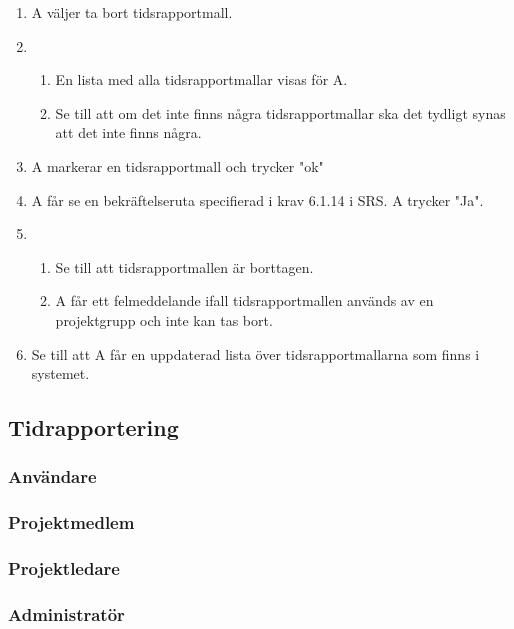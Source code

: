\documentclass[a4paper]{article}
\begin{document}
\begin{ST}
\begin{enumerate}
\item A väljer ta bort tidsrapportmall.
\item 
\begin{enumerate}
\item En lista med alla tidsrapportmallar visas för A.
\item Se till att om det inte finns några tidsrapportmallar ska det tydligt synas att det inte finns några.
\end{enumerate}
\item A markerar en tidsrapportmall och trycker "ok"
\item A får se en bekräftelseruta specifierad i krav 6.1.14 i SRS. A trycker "Ja".
\item
\begin{enumerate}
\item Se till att tidsrapportmallen är borttagen.
\item A får ett felmeddelande ifall tidsrapportmallen används av en projektgrupp och inte kan tas bort.
\end{enumerate}
\item Se till att A får en uppdaterad lista över tidsrapportmallarna som finns i systemet.
\end{enumerate}





\subsection{Tidrapportering}


\subsubsection{Användare}
\subsubsection{Projektmedlem}
\subsubsection{Projektledare}
\subsubsection{Administratör}

\end{ST}
\end{document}
